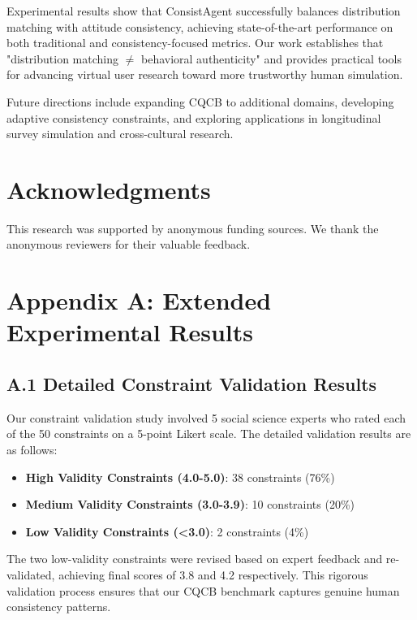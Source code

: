 \documentclass[sigconf, anonymous]{acmart}
\begin{document}
Experimental results show that ConsistAgent successfully balances distribution matching with attitude consistency, achieving state-of-the-art performance on both traditional and consistency-focused metrics. Our work establishes that "distribution matching $\neq$ behavioral authenticity" and provides practical tools for advancing virtual user research toward more trustworthy human simulation.

Future directions include expanding CQCB to additional domains, developing adaptive consistency constraints, and exploring applications in longitudinal survey simulation and cross-cultural research.

\section*{Acknowledgments}

This research was supported by anonymous funding sources. We thank the anonymous reviewers for their valuable feedback.




\newpage
\section*{Appendix A: Extended Experimental Results}

\subsection*{A.1 Detailed Constraint Validation Results}

Our constraint validation study involved 5 social science experts who rated each of the 50 constraints on a 5-point Likert scale. The detailed validation results are as follows:

\begin{itemize}
    \item \textbf{High Validity Constraints (4.0-5.0)}: 38 constraints (76\%)
    \item \textbf{Medium Validity Constraints (3.0-3.9)}: 10 constraints (20\%)
    \item \textbf{Low Validity Constraints (<3.0)}: 2 constraints (4\%)
\end{itemize}

The two low-validity constraints were revised based on expert feedback and re-validated, achieving final scores of 3.8 and 4.2 respectively. This rigorous validation process ensures that our CQCB benchmark captures genuine human consistency patterns.
\end{document}
